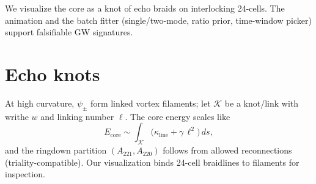 We visualize the core as a knot of echo braids on interlocking 24-cells. The animation and the batch fitter (single/two-mode, ratio prior, time-window picker) support falsifiable GW signatures.

\section{Echo knots}
At high curvature, $\psi_\pm$ form linked vortex filaments; let $\mathcal{K}$ be a knot/link with writhe $w$ and linking number $\ell$. The core energy scales like
\[
E_\text{core}\sim \int_{\mathcal{K}}\!\big(\kappa_\text{line}+\gamma\,\ell^2\big)\,ds,
\]
and the ringdown partition $(A_{221},A_{220})$ follows from allowed reconnections (triality-compatible). Our visualization binds 24-cell braidlines to filaments for inspection.
